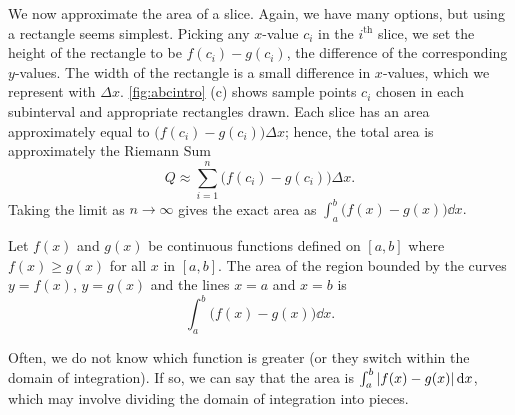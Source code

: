 We now approximate the area of a slice. Again, we have many options, but using a rectangle seems simplest. Picking any $x$-value $c_i$ in the $i^{\text{th}}$ slice, we set the height of the rectangle to be $f(c_i)-g(c_i)$, the difference of the corresponding $y$-values. The width of the rectangle is a small difference in $x$-values, which we represent with $\Delta x$. \autoref{fig:abcintro} (c) shows sample points $c_i$ chosen in each subinterval and appropriate rectangles drawn.
Each slice has an area approximately equal to $\bigl(f(c_i)-g(c_i)\bigr)\Delta x$; hence, the total area is approximately the Riemann Sum\vspace{-.5\baselineskip}
\[Q \approx \sum_{i=1}^n \bigl(f(c_i)-g(c_i)\bigr)\Delta x.\]
Taking the limit as $n\to \infty$ gives the exact area as $\int_a^b \bigl(f(x)-g(x)\bigr)\dd x.$

\begin{theorem}\label{thm:areabetweencurves}%
Let $f(x)$ and $g(x)$ be continuous functions defined on $[a,b]$ where $f(x)\geq g(x)$ for all $x$ in $[a,b]$. The area of the region bounded by the curves $y=f(x)$, $y=g(x)$ and the lines $x=a$ and $x=b$ is 
\[\int_a^b \bigl(f(x)-g(x)\bigr)\dd x.\]
\end{theorem}

Often, we do not know which function is greater (or they switch within the domain of integration).  If so, we can say that the area is $\int_a^b\left\lvert f(x)-g(x) \right\rvert\operatorname{d}\! x$, which may involve dividing the domain of integration into pieces.


